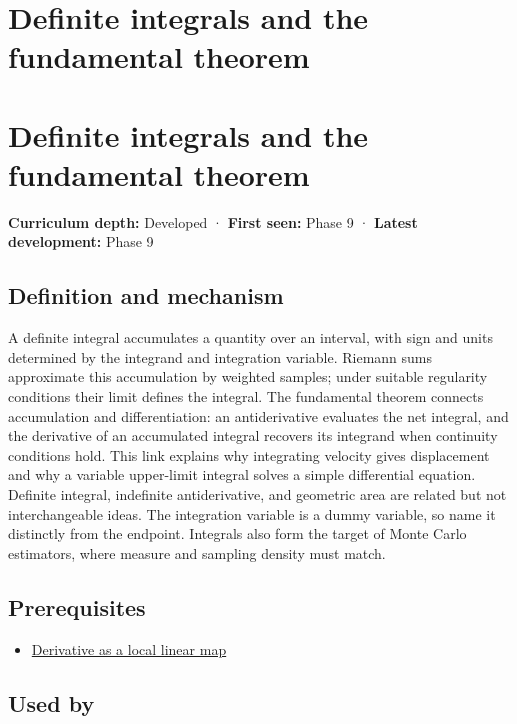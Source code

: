 \hypertarget{appendix-1a50e72435c2}{}
\section*{Definite integrals and the fundamental theorem}
\section{Definite integrals and the fundamental theorem}\label{definite-integrals-and-the-fundamental-theorem}

\textbf{Curriculum depth:} Developed · \textbf{First seen:} Phase 9 · \textbf{Latest development:} Phase 9

\subsection{Definition and mechanism}\label{definition-and-mechanism}

A definite integral accumulates a quantity over an interval, with sign and units determined by the integrand and integration variable. Riemann sums approximate this accumulation by weighted samples; under suitable regularity conditions their limit defines the integral. The fundamental theorem connects accumulation and differentiation: an antiderivative evaluates the net integral, and the derivative of an accumulated integral recovers its integrand when continuity conditions hold. This link explains why integrating velocity gives displacement and why a variable upper-limit integral solves a simple differential equation. Definite integral, indefinite antiderivative, and geometric area are related but not interchangeable ideas. The integration variable is a dummy variable, so name it distinctly from the endpoint. Integrals also form the target of Monte Carlo estimators, where measure and sampling density must match.

\subsection{Prerequisites}\label{prerequisites}

\begin{itemize}
\tightlist
\item
  \hyperref[appendix-7bc181935c42]{Derivative as a local linear map}
\end{itemize}

\subsection{Used by}\label{used-by}

